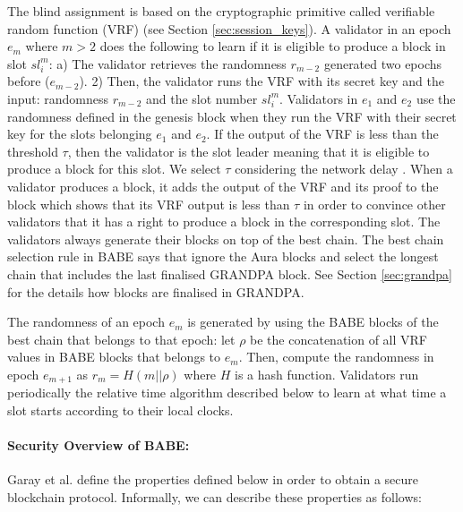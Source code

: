 The blind assignment is based on the cryptographic primitive called verifiable random function (VRF) \cite{vrf} (see Section \ref{sec:session_keys}). 
A validator in an epoch $e_m$ where $m > 2$ does the following to learn if it is eligible to produce a block in slot $sl_i^m$: a) The validator retrieves the randomness $r_{m-2}$ generated two epochs %
before ($e_{m-2}$). 2) Then, the validator runs the VRF with its secret key and the input:  randomness $r_{m-2}$ and the slot number $ sl_i^m $. Validators in $e_1$ and $e_2$ use the randomness defined in the genesis block when they run the VRF with their secret key for the slots belonging $e_1$ and $e_2$. If the output of the VRF is less than the threshold $ \tau $, then the validator is the slot leader meaning that it is eligible to produce a block for this slot. We select $\tau$ considering the network delay \cite{babe}. 
When a validator produces a block, it adds the output of the VRF and its proof to the block which shows that its VRF output is less than $\tau$  in order to convince other validators that it has a right to produce a block in the corresponding slot. The validators always generate their blocks on top of the best chain.
The best chain selection rule in BABE says that ignore the Aura blocks and select the longest chain that includes the last finalised GRANDPA block. See Section \ref{sec:grandpa} for the details how blocks are finalised in GRANDPA.

The randomness of an epoch $e_m$ is generated by using the BABE blocks of the best chain that belongs to that epoch: let \(\rho\) be the concatenation of all  VRF values in BABE blocks that belongs to $e_m$. Then, compute the randomness in epoch $e_{m+1}$ as $r_{m} = H(m
||\rho)$ where $ H $ is a hash function. Validators run periodically the relative time algorithm described below to learn at what time a slot starts according to their local clocks.




\paragraph{Security Overview of BABE:} Garay et al. \cite{backbone} define the properties defined below in order to obtain a secure blockchain protocol. Informally, we can describe these properties as follows:

